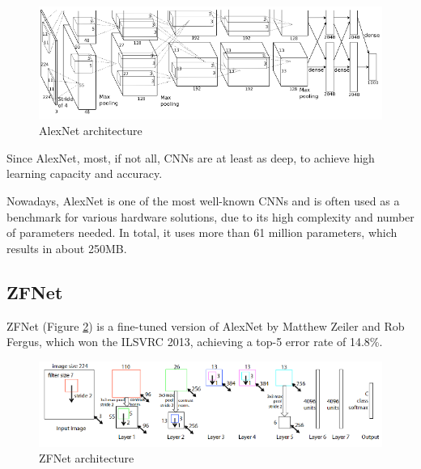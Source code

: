 \begin{figure} [H]
	\centering
	\includegraphics[width=\textwidth]{Images/CNNArchitectures/AlexNet.png}
	\decoRule
	\caption[AlexNet architecture]{AlexNet architecture}
	\label{fig:AlexNet}
\end{figure}

Since AlexNet, most, if not all, CNNs are at least as deep, to achieve high learning capacity and accuracy.

Nowadays, AlexNet is one of the most well-known CNNs and is often used as a benchmark for various hardware solutions, due to its high complexity and number of parameters needed. In total, it uses more than 61 million parameters, which results in about 250MB.

\subsection{ZFNet}
ZFNet \cite{Visualizing-and-Understanding-Convolutional-Networks} (Figure \ref{fig:ZFNet}) is a fine-tuned version of AlexNet by Matthew Zeiler and Rob Fergus, which won the ILSVRC 2013, achieving a top-5 error rate of 14.8\%.

\begin{figure} [H]
	\centering
	\includegraphics[width=\textwidth]{Images/CNNArchitectures/ZFNet.png}
	\decoRule
	\caption[ZFNet architecture]{ZFNet architecture}
	\label{fig:ZFNet}
\end{figure}

